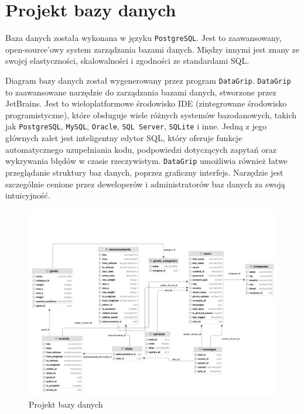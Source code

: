 \section{Projekt bazy danych}
Baza danych została wykonana w języku \texttt{PostgreSQL}. Jest to zaawansowany, open-source'owy system zarządzania bazami danych. Między innymi jest znany ze swojej elastyczności, skalowalności i zgodności ze standardami SQL.

Diagram bazy danych został wygenerowany przez program \texttt{DataGrip}. \texttt{DataGrip} to zaawansowane narzędzie do zarządzania bazami danych, stworzone przez JetBrains. Jest to wieloplatformowe środowisko IDE (zintegrowane środowisko programistyczne), które obsługuje wiele różnych systemów bazodanowych, takich jak \texttt{PostgreSQL}, \texttt{MySQL}, \texttt{Oracle}, \texttt{SQL Server}, \texttt{SQLite} i inne. Jedną z jego głównych zalet jest inteligentny edytor SQL, który oferuje funkcje automatycznego uzupełniania kodu, podpowiedzi dotyczących zapytań oraz wykrywania błędów w czasie rzeczywistym. \texttt{DataGrip} umożliwia również łatwe przeglądanie struktury baz danych, poprzez graficzny interfejs. Narzędzie jest szczególnie cenione przez deweloperów i administratorów baz danych za swoją intuicyjność.

\begin{figure}[H]
	\centering
		\includegraphics[width=1\linewidth]{rozdzial1/baza_danych.jpg}
	\caption{Projekt bazy danych}
	\label{Rys. fig:Projekt bazy danych}
\end{figure}

